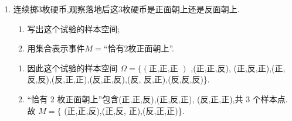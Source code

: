 \begin{enumerate}
\begin{jieda}
    \begin{enumerate}
        \item 这个试验的样本空间 $\Omega$ 为\\
$\{ \left( {1,1}\right) ,\left( {1,2}\right) ,\left( {1,3}\right) ,\left( {1,4}\right) ,\left( {1,5}\right) ,\left( {1,6}\right)$ ,\\
$\left( {2,1}\right) ,\left( {2,2}\right) ,\left( {2,3}\right) ,\left( {2,4}\right) ,\left( {2,5}\right) ,\left( {2,6}\right)$ ,\\
$\left( {3,1}\right) ,\left( {3,2}\right) ,\left( {3,3}\right) ,\left( {3,4}\right) ,\left( {3,5}\right) ,\left( {3,6}\right)$ ,\\
$\left( {4,1}\right) ,\left( {4,2}\right) ,\left( {4,3}\right) ,\left( {4,4}\right) ,\left( {4,5}\right) ,\left( {4,6}\right)$ ,\\
$\left( {5,1}\right) ,\left( {5,2}\right) ,\left( {5,3}\right) ,\left( {5,4}\right) ,\left( {5,5}\right) ,\left( {5,6}\right)$ ,\\
$\left( {6,1}\right) ,\left( {6,2}\right) ,\left( {6,3}\right) ,\left( {6,4}\right) ,\left( {6,5}\right) ,\left( {6,6}\right) \}$ .
        \item 36种
        \item 事件 $A$ 的含义为抛掷红、蓝两枚骰子,掷出的点数之和
为 7.
    \end{enumerate}
\end{jieda}


\item 连续掷3枚硬币,观察落地后这3枚硬币是正面朝上还是反面朝上.
\begin{enumerate}
\item 写出这个试验的样本空间;
\item 用集合表示事件$M=$“恰有2枚正面朝上”.
\end{enumerate}

\begin{jieda}
    \begin{enumerate}
        \item 因此这个试验的样本空间 $\Omega  = \{ \left( \text{正,正,正 }\right)$ ,(正,正,反),
(正,反,正),(正,反,反),(反,正,正),(反,正,反),(反,
反,正),(反,反,反)\}.
        \item “恰有 2 枚正面朝上”包含(正,正,反),(正,反,正),
(反,正,正),共 3 个样本点. 故 $M = \{$ (正,正,反),(正,反,
正),(反,正,正)\}.
    \end{enumerate}
\end{jieda}




\end{enumerate}
